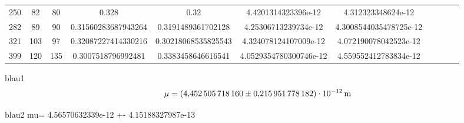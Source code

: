 \begin{table}[h!]
\begin{tabular}{c c c c c c c c c c c}
      250   &   82    &   80    &   0.328                 &     0.32                    &   4.4201314323396e-12     & 4.312323348624e-12       \\
      282   &   89    &   90    &   0.31560283687943264   &     0.3191489361702128      &   4.25306713239734e-12    & 4.3008544035478725e-12   \\
      321   &   103   &   97    &   0.32087227414330216   &     0.30218068535825543     &   4.324078124107009e-12   & 4.072190078042523e-12    \\
      399   &   120   &   135   &   0.3007518796992481    &     0.3383458646616541      &   4.0529354780300746e-12  & 4.559552412783834e-12    \\
    \bottomrule
  \end{tabular}
\end{table}

blau1
\begin{equation*}
  \mu = \SI{4.45250571816 \pm 0.215951778182 e-12}{m}
\end{equation*}

blau2 mu= 4.56570632339e-12 +- 4.15188327987e-13

%
